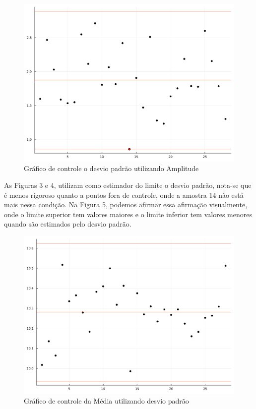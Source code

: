 \documentclass[
  letterpaper,
  DIV=11,
  numbers=noendperiod]{scrartcl}
\begin{document}
\begin{figure}

{\centering \includegraphics{trabalho1_files/figure-pdf/fig2-output-1.pdf}

}

\caption{Gráfico de controle o desvio padrão utilizando Amplitude}

\end{figure}

As Figuras 3 e 4, utilizam como estimador do limite o desvio padrão,
nota-se que é menos rigoroso quanto a pontos fora de controle, onde a
amostra 14 não está mais nessa condição. Na Figura 5, podemos afirmar
essa afirmação visualmente, onde o limite superior tem valores maiores e
o limite inferior tem valores menores quando são estimados pelo desvio
padrão.

\begin{figure}

{\centering \includegraphics{trabalho1_files/figure-pdf/fig3-output-1.pdf}

}

\caption{Gráfico de controle da Média utilizando desvio padrão}

\end{figure}
\end{document}
